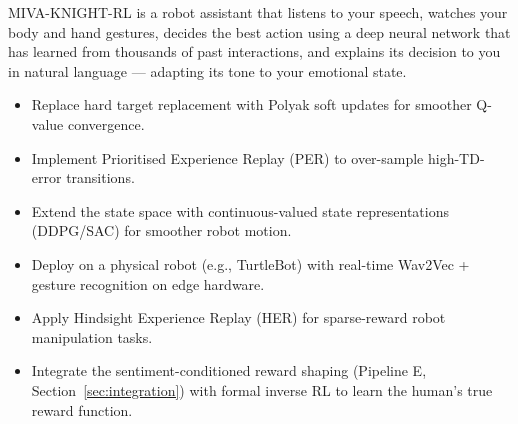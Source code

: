 \documentclass[12pt,a4paper]{article}
\theoremstyle{definition}
\theoremstyle{plain}
\theoremstyle{remark}
\begin{document}
\begin{tcolorbox}[laymanbox,title={One-Sentence Summary}]
MIVA-KNIGHT-RL is a robot assistant that listens to your speech, watches your body and hand gestures, decides the best action using a deep neural network that has learned from thousands of past interactions, and explains its decision to you in natural language — adapting its tone to your emotional state.
\end{tcolorbox}

\vfill
\begin{center}
\begin{tcolorbox}[keybox,width=0.85\textwidth,title={Future Directions}]
\begin{itemize}[nosep]
  \item Replace hard target replacement with Polyak soft updates for smoother Q-value convergence.
  \item Implement Prioritised Experience Replay (PER) to over-sample high-TD-error transitions.
  \item Extend the state space with continuous-valued state representations (DDPG/SAC) for smoother robot motion.
  \item Deploy on a physical robot (e.g., TurtleBot) with real-time Wav2Vec + gesture recognition on edge hardware.
  \item Apply Hindsight Experience Replay (HER) for sparse-reward robot manipulation tasks.
  \item Integrate the sentiment-conditioned reward shaping (Pipeline E, Section~\ref{sec:integration}) with formal inverse RL to learn the human's true reward function.
\end{itemize}
\end{tcolorbox}
\end{center}
\end{document}

